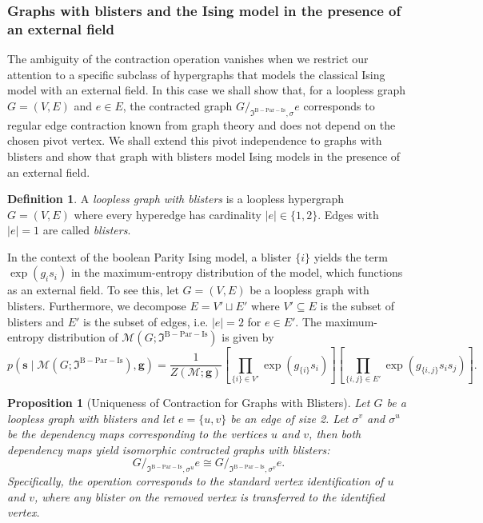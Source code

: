 \documentclass[11pt,reqno]{amsart}
\newcommand{\vecs}{\boldsymbol{s}}
\newcommand{\vecg}{\boldsymbol{g}}
\newcommand{\Mo}{\mathcal{M}}
\newcommand{\mcib}{\mathfrak{I}^{\mathrm{B-Par-Is}}}
\theoremstyle{plain}
\newtheorem{proposition}[theorem]{Proposition}
\theoremstyle{definition}
\newtheorem{definition}[theorem]{Definition}
\numberwithin{equation}{section}
\begin{document}
\subsubsection{Graphs with blisters and the Ising model in the presence of an external field}
\label{Section:blisters}
The ambiguity of the contraction operation vanishes when we restrict our attention to a specific subclass of hypergraphs that models the classical Ising model with an external field. In this case we shall show that, for a loopless graph $G = (V,E)$ and $e \in E$, the contracted graph $G/_{\mcib, \sigma}e$ corresponds to regular edge contraction known from graph theory and does not depend on the chosen pivot vertex. We shall extend this pivot independence to graphs with blisters and show that graph with blisters model Ising models in the presence of an external field.

\begin{definition}
    A \emph{loopless graph with blisters} is a loopless hypergraph $G=(V,E)$ where every hyperedge has cardinality $|e| \in \{1, 2\}$. Edges with $|e|=1$ are called \emph{blisters}.
\end{definition}

In the context of the boolean Parity Ising model, a blister $\{i\}$ yields the term $\exp(g_i s_i)$ in the maximum-entropy distribution of the model, which functions as an external field. To see this, let $G = (V,E)$ be a loopless graph with blisters. Furthermore, we decompose $E = V' \sqcup E'$ where $V' \subseteq E$ is the subset of blisters and $E'$ is the subset of edges, i.e. $|e| = 2$ for $e \in E'$. The maximum-entropy distribution of $\Mo(G; \mcib)$ is given by
\[
p(\vecs \mid \Mo(G; \mcib), \vecg) = \frac{1}{Z(\Mo; \vecg)}\left[ \prod_{\{i\} \in V'} \exp(g_{\{i\}} s_i) \right] \left[ \prod_{\{i,j\} \in E'} \exp(g_{\{i,j\}} s_{i}s_j) \right].
\]

\begin{proposition}[Uniqueness of Contraction for Graphs with Blisters]
    \label{prop:blister_unique}
    Let $G$ be a loopless graph with blisters and let $e = \{u, v\}$ be an edge of size 2. Let $\sigma^v$ and $\sigma^u$ be the dependency maps corresponding to the vertices $u$ and $v$, then both dependency maps yield isomorphic contracted graphs with blisters:
    \[ G /_{\mcib, \sigma^u} e \cong G /_{\mcib, \sigma^v} e. \]
    Specifically, the operation corresponds to the standard vertex identification of $u$ and $v$, where any blister on the removed vertex is transferred to the identified vertex.
\end{proposition}
\end{document}
